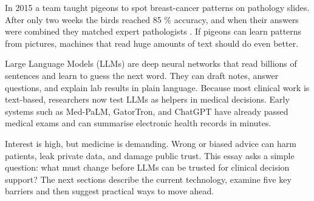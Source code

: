 \documentclass[12pt,a4paper]{scrreprt}
\begin{document}
\newpage
\cleardoublepage
{}
\setcounter{page}{1}
In 2015 a team taught pigeons to spot breast-cancer patterns on pathology slides. After only two weeks the birds reached 85 \% accuracy, and when their answers were combined they matched expert pathologists \autocite{Pigeon}. If pigeons can learn patterns from pictures, machines that read huge amounts of text should do even better.\par
\vspace{\baselineskip}
\noindent
Large Language Models (LLMs) are deep neural networks that read billions of sentences and learn to guess the next word. They can draft notes, answer questions, and explain lab results in plain language. Because most clinical work is text-based, researchers now test LLMs as helpers in medical decisions. Early systems such as Med-PaLM, GatorTron, and ChatGPT have already passed medical exams and can summarise electronic health records in minutes.\par
\vspace{\baselineskip}
\noindent
Interest is high, but medicine is demanding. Wrong or biased advice can harm patients, leak private data, and damage public trust. This essay asks a simple question: what must change before LLMs can be trusted for clinical decision support? The next sections describe the current technology, examine five key barriers and then suggest practical ways to move ahead.
\end{document}
